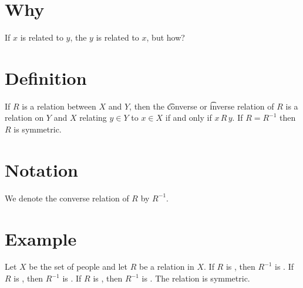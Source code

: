 
\section*{Why}

If $x$ is related to $y$, the $y$ is related to $x$, but how?

\section*{Definition}

If $R$ is a relation between $X$ and $Y$, then the \t{converse} or \t{inverse} relation of $R$ is a relation on $Y$ and $X$ relating $y \in Y$ to $x \in X$ if and only if $x\,R\,y$.
If $R = R^{-1}$ then $R$ is symmetric.

\section*{Notation}

We denote the converse relation of $R$ by $R^{-1}$.

\section*{Example}

Let $X$ be the set of people and let $R$ be a relation in $X$.
If $R$ is , then $R^{-1}$ is .
If $R$ is , then $R^{-1}$ is .
If $R$ is , then $R^{-1}$ is .
The relation  is symmetric.

\blankpage